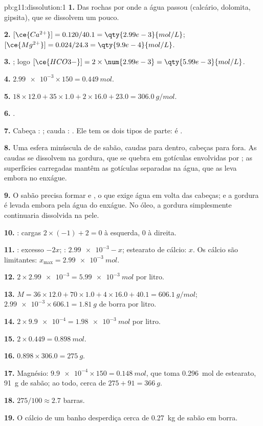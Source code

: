 \begin{solution}{pb:g11:dissolution:1}
\textbf{1.} Das rochas por onde a água passou (calcário, dolomita,
gipsita), que se dissolvem um pouco.

\textbf{2.} $[\ce{Ca^{2+}}] = 0.120 / 40.1 = \qty{2.99e-3}{mol/L}$;
$[\ce{Mg^{2+}}] = 0.024 / 24.3 = \qty{9.9e-4}{mol/L}$.

\textbf{3.} ; logo
$[\ce{HCO3-}] = 2 \times \num{2.99e-3} = \qty{5.99e-3}{mol/L}$.

\textbf{4.} $\num{2.99e-3} \times 150 = \qty{0.449}{mol}$.

\textbf{5.} $18 \times 12.0 + 35 \times 1.0 + 2 \times 16.0 + 23.0 =
\qty{306.0}{g/mol}$.

\textbf{6.} .

\textbf{7.} Cabeça : ; cauda :
. Ele tem os dois tipos de parte: é .

\textbf{8.} Uma esfera minúscula de  de sabão, caudas para dentro,
cabeças para fora. As caudas se dissolvem na gordura, que se quebra em
gotículas envolvidas por ; as superfícies carregadas mantêm as
gotículas separadas na água, que as leva embora no enxágue.

\textbf{9.} O sabão precisa formar  e , o que exige água em
volta das cabeças; e a gordura é levada embora pela água do enxágue. No
óleo, a gordura simplesmente continuaria dissolvida na pele.

\textbf{10.} : cargas
$2 \times (-1) + 2 = 0$ à esquerda, $0$ à direita.

\textbf{11.} : excesso $- 2x$; :
$\num{2.99e-3} - x$; estearato de cálcio: $x$. Os  cálcio são
limitantes: $x_{\max} = \qty{2.99e-3}{mol}$.

\textbf{12.} $2 \times \num{2.99e-3} = \qty{5.99e-3}{mol}$ por litro.

\textbf{13.} $M = 36 \times 12.0 + 70 \times 1.0 + 4 \times 16.0 + 40.1 =
\qty{606.1}{g/mol}$; $\num{2.99e-3} \times 606.1 = \qty{1.81}{g}$ de
borra por litro.

\textbf{14.} $2 \times \num{9.9e-4} = \qty{1.98e-3}{mol}$ por litro.

\textbf{15.} $2 \times 0.449 = \qty{0.898}{mol}$.

\textbf{16.} $0.898 \times 306.0 = \qty{275}{g}$.

\textbf{17.} Magnésio: $\num{9.9e-4} \times 150 = \qty{0.148}{mol}$,
que toma \qty{0.296}{mol} de estearato, \qty{91}{g} de sabão; ao todo,
cerca de $275 + 91 = \qty{366}{g}$.

\textbf{18.} $275 / 100 \approx 2.7$ barras.

\textbf{19.} O cálcio de um banho desperdiça cerca de \qty{0.27}{kg} de
sabão em borra.
\end{solution}
